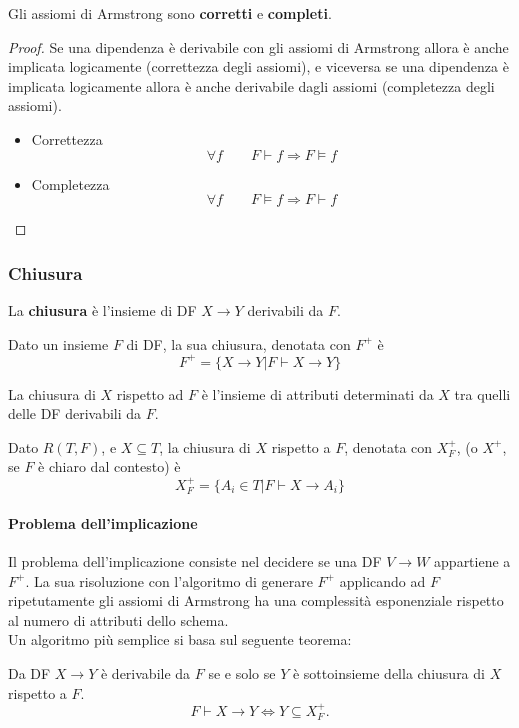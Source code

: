 \newpage
\begin{theorem}
	Gli assiomi di Armstrong sono \textbf{corretti} e \textbf{completi}.
\end{theorem}
\begin{proof}
	Se una dipendenza è derivabile con gli assiomi di Armstrong allora è anche implicata logicamente (correttezza degli assiomi), e viceversa se una dipendenza è implicata logicamente allora è anche derivabile dagli assiomi (completezza degli assiomi).
	\begin{itemize}
		\item Correttezza
		\begin{equation}
			\forall f \qquad F \vdash f \Longrightarrow F \models f
		\end{equation}
		\item Completezza
		\begin{equation}
			\forall f \qquad F \models f \Longrightarrow F \vdash f
		\end{equation}
	\end{itemize}
\end{proof}

 \subsubsection{Chiusura}
 La \textbf{chiusura} è l’insieme di DF $X \to Y$ derivabili da $F$.
\begin{definition}[Chiusura]
	Dato un insieme $F$ di DF, la sua chiusura, denotata con $F^+$ è
	\begin{equation}
		F^+ = \{ X \to Y \vert F \vdash X \to Y\}
	\end{equation}
\end{definition}

La chiusura di $X$ rispetto ad $F$ è l’insieme di attributi determinati da $X$ tra quelli delle DF derivabili da $F$.
\begin{definition}[Chiusura]
	Dato $R(T, F)$, e $X \subseteq T$, la chiusura di $X$ rispetto a $F$, denotata con $X_F^+$, (o $X^+$, se $F$ è chiaro dal contesto) è
	\begin{equation}
		X_F^+ = \{A_i \in T \vert F \vdash X \to A_i \}
	\end{equation}
\end{definition}

\paragraph{Problema dell'implicazione}
Il problema dell'implicazione consiste nel decidere se una DF $V \to W$ appartiene a $F^+$. La sua risoluzione con l’algoritmo di generare $F^+$ applicando ad $F$ ripetutamente gli assiomi di Armstrong ha una complessità esponenziale rispetto al numero di attributi dello schema.\\
Un algoritmo più semplice si basa sul seguente teorema:
\begin{theorem}
	Da DF $X \to Y$ è derivabile da $F$ se e solo se $Y$ è sottoinsieme	della chiusura di $X$ rispetto a $F$.
	\begin{equation}
		F\vdash X \to Y \Leftrightarrow Y \subseteq X_F^+.
	\end{equation}
\end{theorem}

